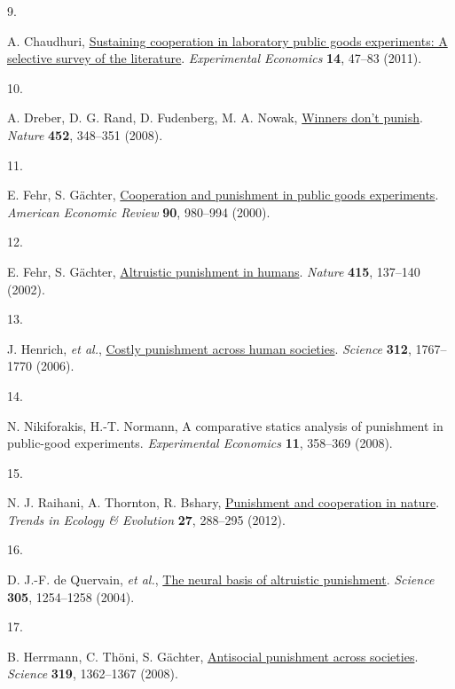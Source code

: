 \documentclass[
  man, donotrepeattitle,floatsintext]{apa6}
\newlength{\cslhangindent}
\newlength{\csllabelwidth}
\newlength{\cslentryspacingunit} %
\newenvironment{CSLReferences}[2] %
 {%
  \setlength{\parindent}{0pt}
  \ifodd #1
  \let\oldpar\par
  \def\par{\hangindent=\cslhangindent\oldpar}
  \fi
  \setlength{\parskip}{#2\cslentryspacingunit}
 }%
 {}
\newcommand{\CSLLeftMargin}[1]{\parbox[t]{\csllabelwidth}{#1}}
\newcommand{\CSLRightInline}[1]{\parbox[t]{\linewidth - \csllabelwidth}{#1}\break}
\begin{document}
\begin{CSLReferences}{0}{0}
\leavevmode{}%
\CSLLeftMargin{9. }%
\CSLRightInline{A. Chaudhuri, \href{https://doi.org/10.1007/s10683-010-9257-1}{Sustaining cooperation in laboratory public goods experiments: A selective survey of the literature}. \emph{Experimental Economics} \textbf{14}, 47--83 (2011).}

\leavevmode{}%
\CSLLeftMargin{10. }%
\CSLRightInline{A. Dreber, D. G. Rand, D. Fudenberg, M. A. Nowak, \href{https://doi.org/10.1038/nature06723}{Winners don't punish}. \emph{Nature} \textbf{452}, 348--351 (2008).}

\leavevmode{}%
\CSLLeftMargin{11. }%
\CSLRightInline{E. Fehr, S. Gächter, \href{https://www.jstor.org/stable/117319}{Cooperation and punishment in public goods experiments}. \emph{American Economic Review} \textbf{90}, 980--994 (2000).}

\leavevmode{}%
\CSLLeftMargin{12. }%
\CSLRightInline{E. Fehr, S. Gächter, \href{https://doi.org/10.1038/415137a}{Altruistic punishment in humans}. \emph{Nature} \textbf{415}, 137--140 (2002).}

\leavevmode{}%
\CSLLeftMargin{13. }%
\CSLRightInline{J. Henrich, \emph{et al.}, \href{https://doi.org/10.1126/science.1127333}{Costly punishment across human societies}. \emph{Science} \textbf{312}, 1767--1770 (2006).}

\leavevmode{}%
\CSLLeftMargin{14. }%
\CSLRightInline{N. Nikiforakis, H.-T. Normann, A comparative statics analysis of punishment in public-good experiments. \emph{Experimental Economics} \textbf{11}, 358--369 (2008).}

\leavevmode{}%
\CSLLeftMargin{15. }%
\CSLRightInline{N. J. Raihani, A. Thornton, R. Bshary, \href{https://doi.org/10.1016/j.tree.2011.12.004}{Punishment and cooperation in nature}. \emph{Trends in Ecology \& Evolution} \textbf{27}, 288--295 (2012).}

\leavevmode{}%
\CSLLeftMargin{16. }%
\CSLRightInline{D. J.-F. de Quervain, \emph{et al.}, \href{https://doi.org/10.1126/science.1100735}{The neural basis of altruistic punishment}. \emph{Science} \textbf{305}, 1254--1258 (2004).}

\leavevmode{}%
\CSLLeftMargin{17. }%
\CSLRightInline{B. Herrmann, C. Thöni, S. Gächter, \href{https://doi.org/10.1126/science.1153808}{Antisocial punishment across societies}. \emph{Science} \textbf{319}, 1362--1367 (2008).}


\end{CSLReferences}
\end{document}
